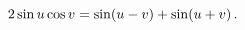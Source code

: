 \[2\mathop{\sin\/}\nolimits u\mathop{\cos\/}\nolimits v=\mathop{\sin\/}\nolimits%
\!\left(u-v\right)+\mathop{\sin\/}\nolimits\!\left(u+v\right).\]